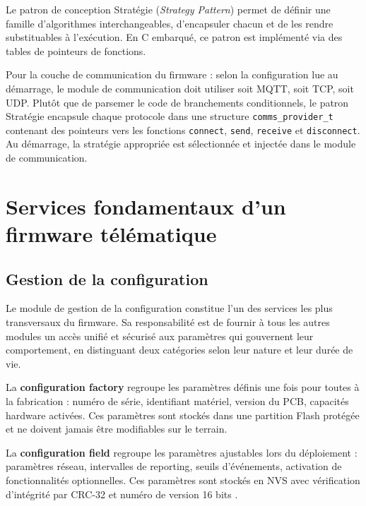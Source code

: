 Le patron de conception Stratégie (\textit{Strategy Pattern}) permet
de définir une famille d'algorithmes interchangeables, d'encapsuler
chacun et de les rendre substituables à l'exécution. En C embarqué,
ce patron est implémenté via des tables de pointeurs de fonctions.

Pour la couche de communication du firmware : selon la configuration
lue au démarrage, le module de communication doit utiliser soit MQTT,
soit TCP, soit UDP. Plutôt que de parsemer le code de branchements
conditionnels, le patron Stratégie encapsule chaque protocole dans
une structure \texttt{comms\_provider\_t} contenant des pointeurs vers
les fonctions \texttt{connect}, \texttt{send}, \texttt{receive} et
\texttt{disconnect}. Au démarrage, la stratégie appropriée est
sélectionnée et injectée dans le module de communication.

\section{Services fondamentaux d'un firmware télématique}
\label{sec:services}

\subsection{Gestion de la configuration}
\label{subsec:config}

Le module de gestion de la configuration constitue l'un des services
les plus transversaux du firmware. Sa responsabilité est de fournir
à tous les autres modules un accès unifié et sécurisé aux paramètres
qui gouvernent leur comportement, en distinguant deux catégories selon
leur nature et leur durée de vie.

La \textbf{configuration factory} regroupe les paramètres définis une
fois pour toutes à la fabrication : numéro de série, identifiant
matériel, version du PCB, capacités hardware activées. Ces paramètres
sont stockés dans une partition Flash protégée et ne doivent jamais
être modifiables sur le terrain.

La \textbf{configuration field} regroupe les paramètres ajustables
lors du déploiement : paramètres réseau, intervalles de reporting,
seuils d'événements, activation de fonctionnalités optionnelles.
Ces paramètres sont stockés en NVS avec vérification d'intégrité
par CRC-32 et numéro de version 16 bits \cite{espidf_nvs}.

